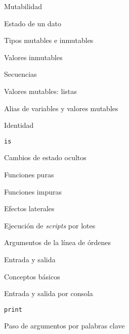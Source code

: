 \begin{longenum}
    \begin{longenum}
        \item Mutabilidad
        \begin{longenum}
            \item Estado de un dato
            \item Tipos mutables e inmutables
            \begin{longenum}
                \item Valores inmutables
                \begin{longenum}
                    \item Secuencias
                \end{longenum}
                \item Valores mutables: listas
            \end{longenum}
            \item Alias de variables y valores mutables
            \item Identidad
            \begin{longenum}
                \item \texttt{is}
            \end{longenum}
        \end{longenum}
        \item Cambios de estado ocultos
        \begin{longenum}
            \item Funciones puras
            \item Funciones impuras
            \item Efectos laterales
            \item Ejecución de \textit{scripts} por lotes
            \begin{longenum}
                \item Argumentos de la línea de órdenes
            \end{longenum}
        \end{longenum}
        \item Entrada y salida
        \begin{longenum}
            \item Conceptos básicos
            \item Entrada y salida por consola
            \begin{longenum}
                \item \texttt{print}
                \begin{longenum}
                    \item Paso de argumentos por palabras clave

\end{longenum}
\end{longenum}
\end{longenum}
\end{longenum}
\end{longenum}
